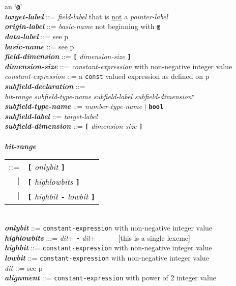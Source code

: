 \documentclass[12pt]{article}
\newcommand{\TT}[1]{{\tt \bfseries #1}}
\newcommand{\STAR}{{\Large $^\star$}}
\newcommand{\emkey}[1]{{\em \bfseries #1}}
\newcommand{\pagref}[1]{p\pageref{#1}}
\newenvironment{indpar}[1][0.3in]%
	{\begin{list}{}%
		     {\setlength{\itemsep}{0in}%
		      \setlength{\topsep}{0in}%
		      \setlength{\parsep}{1ex}%
		      \setlength{\labelwidth}{#1}%
		      \setlength{\leftmargin}{#1}%
		      \addtolength{\leftmargin}{\labelsep}}%
	 \item}%
	{\end{list}}
\begin{document}
\begin{indpar}
    an `\TT{@}' \\
\emkey{target-label}\label{TARGET-LABEL} ::=
    {\em field-label} that is \underline{not} a {\em pointer-label} \\
\emkey{origin-label}\label{ORIGIN-LABEL} ::=
    {\em basic-name} not beginning with \TT{@} \\
\emkey{data-label} ::=  see \pagref{DATA-LABEL} \\
\emkey{basic-name} ::=  see \pagref{BASIC-NAME}
\\[2ex]
\emkey{field-dimension} ::=  \TT{[} {\em dimension-size} \TT{]} \\
\emkey{dimension-size} ::=  {\em constant-expression}
			    with non-negative integer value \\
{\em constant-expression} ::= a {\tt const} valued expression as
    defined on \pagref{CONSTANT-EXPRESSION}
\\[2ex]
\emkey{subfield-declaration}\label{SUBFIELD-DECLARATION} ::= \\
\hspace*{0.5in}
    {\em bit-range} {\em subfield-type-name} {\em subfield-label}
    		{\em subfield-dimension}\STAR{} \\
\emkey{subfield-type-name}\label{SUBFIELD-TYPE-NAME} ::=
    {\em number-type-name} $|$ \TT{bool} \\
\emkey{subfield-label}\label{SUBFIELD-LABEL} ::=  {\em target-label} \\
\emkey{subfield-dimension} ::=  \TT{[} {\em dimension-size} \TT{]} \\
\\[2ex]
\emkey{bit-range}
    \begin{tabular}[t]{@{}rl}
    ::= &  \TT{[} {\em onlybit} \TT{]} \\
    $|$ &  \TT{[} {\em highlowbits} \TT{]} \\
    $|$ &  \TT{[} {\em highbit} \TT{-} {\em lowbit} \TT{]}
    \end{tabular} \\
\emkey{onlybit} ::= {\tt constant-expression}
		    with non-negative integer value \\
\emkey{highlowbits} :::= {\em dit}+ \TT{-} {\em dit}+
           ~~~~~ [this is a single lexeme] \\
\emkey{highbit} ::= {\tt constant-expression}
		    with non-negative integer value \\
\emkey{lowbit} ::= {\tt constant-expression}
		   with non-negative integer value \\
{\em dit} ::= see \pagref{DIT}
\\[2ex]
\emkey{alignment} ::= {\tt constant-expression}
		      with power of 2 integer value
\end{indpar}
\end{document}
